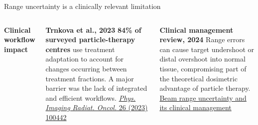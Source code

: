 \documentclass[aspectratio=169,11pt]{beamer}
\begin{document}
\begin{frame}{Range uncertainty is a clinically relevant limitation}
\begin{columns}[T,onlytextwidth]
{\footnotesize\bfseries\color{PTblue}
Clinical workflow impact
}

\vspace{0.10cm}

{\tiny

\textbf{Trnkova et al., 2023}  
\textbf{84\% of surveyed particle-therapy centres} use treatment adaptation to account for changes occurring between treatment fractions. A major barrier was the lack of integrated and efficient workflows.  
\href{https://doi.org/10.1016/j.phro.2023.100442}
{\textit{Phys. Imaging Radiat. Oncol.} 26 (2023) 100442}

\vspace{0.16cm}

\textbf{Clinical management review, 2024}  
Range errors can cause target undershoot or distal overshoot into normal tissue, compromising part of the theoretical dosimetric advantage of particle therapy.  
\href{https://doi.org/10.1051/vcm/2024004}
{Beam range uncertainty and its clinical management}

}

\end{columns}
\end{frame}
\end{document}
